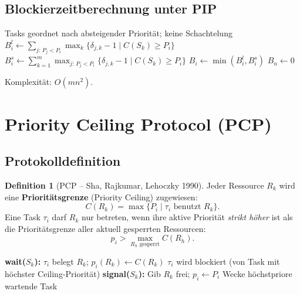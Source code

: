 ﻿\documentclass[a4paper,12pt]{report}
\theoremstyle{definition}
\newtheorem{definition}{Definition}[chapter]
\begin{document}
\subsection{Blockierzeitberechnung unter PIP}

\begin{algorithmic}[1]
	\Require Tasks geordnet nach absteigender Priorität; keine Schachtelung
	\State $B_i^l \leftarrow \sum_{j:\,P_j < P_i} \max_k\{\delta_{j,k}-1 \mid C(S_k) \geq P_i\}$
	\State $B_i^s \leftarrow \sum_{k=1}^m \max_{j:\,P_j < P_i}\{\delta_{j,k}-1 \mid C(S_k) \geq P_i\}$
	\State $B_i \leftarrow \min(B_i^l, B_i^s)$
	\EndFor
	\State $B_n \leftarrow 0$
\end{algorithmic}

Komplexität: $O(mn^2)$.

\section{Priority Ceiling Protocol (PCP)}

\subsection{Protokolldefinition}

\begin{definition}[PCP -- Sha, Rajkumar, Lehoczky 1990]
	Jeder Ressource $R_k$ wird eine \textbf{Prioritätsgrenze} (Priority Ceiling)
	zugewiesen:
	\[
		C(R_k) = \max\{P_i \mid \tau_i \text{ benutzt } R_k\}.
	\]
	Eine Task $\tau_i$ darf $R_k$ nur betreten, wenn ihre aktive Priorität
	\emph{strikt höher} ist als die Prioritätsgrenze aller aktuell gesperrten
	Ressourcen:
	\[
		p_i > \max_{R_h \text{ gesperrt}} C(R_h).
	\]
\end{definition}

\begin{algorithm}[H]
	\caption{Priority Ceiling Protocol (PCP)}
	\begin{algorithmic}[1]
		\State \textbf{wait($S_k$):}
		\State $\tau_i$ belegt $R_k$; $p_i(R_k) \leftarrow C(R_k)$
		\Else
		\State $\tau_i$ wird blockiert (von Task mit höchster Ceiling-Priorität)
		\EndIf
		\State
		\State \textbf{signal($S_k$):}
		\State Gib $R_k$ frei; $p_i \leftarrow P_i$ 
		\State Wecke höchstpriore wartende Task
	\end{algorithmic}
\end{algorithm}
\end{document}
